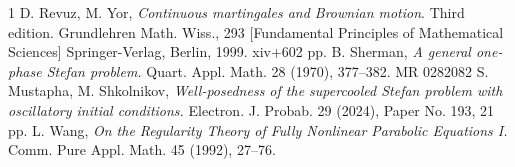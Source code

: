 \documentclass{article}
\numberwithin{equation}{section}
\numberwithin{figure}{section}
\theoremstyle{plain}
\theoremstyle{plain}
\theoremstyle{plain}
\theoremstyle{plain}
\theoremstyle{definition}
\theoremstyle{remark}
\begin{document}
\begin{thebibliography}{1}
 D. Revuz, M. Yor, {\it Continuous martingales and Brownian motion}. Third edition. Grundlehren Math. Wiss., 293 [Fundamental Principles of Mathematical Sciences]
Springer-Verlag, Berlin, 1999. xiv+602 pp.
 B. Sherman, {\it A general one-phase Stefan problem.} Quart. Appl. Math. 28 (1970), 377--382.
MR 0282082
 S. Mustapha, M. Shkolnikov, {\it Well-posedness of the supercooled Stefan problem with oscillatory initial conditions.} Electron. J. Probab. 29 (2024), Paper No. 193, 21 pp.
 L. Wang, {\it On the Regularity Theory of
Fully Nonlinear Parabolic Equations I.} Comm. Pure Appl. Math. 45 (1992), 27--76.
\end{thebibliography}
\end{document}
